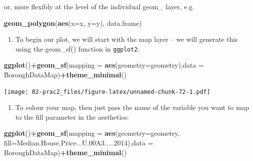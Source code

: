 \documentclass[]{book}
\newenvironment{Shaded}{\begin{snugshade}}{\end{snugshade}}
\newcommand{\DataTypeTok}[1]{\textcolor[rgb]{0.13,0.29,0.53}{#1}}
\newcommand{\DecValTok}[1]{\textcolor[rgb]{0.00,0.00,0.81}{#1}}
\newcommand{\FloatTok}[1]{\textcolor[rgb]{0.00,0.00,0.81}{#1}}
\newcommand{\KeywordTok}[1]{\textcolor[rgb]{0.13,0.29,0.53}{\textbf{#1}}}
\newcommand{\NormalTok}[1]{#1}
\newcommand{\OperatorTok}[1]{\textcolor[rgb]{0.81,0.36,0.00}{\textbf{#1}}}
\providecommand{\tightlist}{%
  \setlength{\itemsep}{0pt}\setlength{\parskip}{0pt}}
\begin{document}
or, more flexibly at the level of the individual geom\_ layer, e.g.

\begin{Shaded}
\begin{Highlighting}[]
\KeywordTok{geom_polygon}\NormalTok{(}\KeywordTok{aes}\NormalTok{(}\DataTypeTok{x=}\NormalTok{x, }\DataTypeTok{y=}\NormalTok{y), data.frame)}
\end{Highlighting}
\end{Shaded}

\begin{enumerate}
\def\labelenumi{\arabic{enumi}.}
\setcounter{enumi}{16}
\tightlist
\item
  To begin our plot, we will start with the map layer -- we will generate this using the geom\_sf() function in \texttt{ggplot2}:
\end{enumerate}

\begin{Shaded}
\begin{Highlighting}[]
\KeywordTok{ggplot}\NormalTok{()}\OperatorTok{+}\KeywordTok{geom_sf}\NormalTok{(}\DataTypeTok{mapping =} \KeywordTok{aes}\NormalTok{(}\DataTypeTok{geometry=}\NormalTok{geometry),}\DataTypeTok{data =}\NormalTok{ BoroughDataMap)}\OperatorTok{+}\KeywordTok{theme_minimal}\NormalTok{()}
\end{Highlighting}
\end{Shaded}

\texttt{[image: 02-prac2\_files/figure-latex/unnamed-chunk-72-1.pdf]}

\begin{enumerate}
\def\labelenumi{\arabic{enumi}.}
\setcounter{enumi}{17}
\tightlist
\item
  To colour your map, then just pass the name of the variable you want to map to the fill parameter in the aesthetics:
\end{enumerate}

\begin{Shaded}
\begin{Highlighting}[]
\KeywordTok{ggplot}\NormalTok{()}\OperatorTok{+}\KeywordTok{geom_sf}\NormalTok{(}\DataTypeTok{mapping =} \KeywordTok{aes}\NormalTok{(}\DataTypeTok{geometry=}\NormalTok{geometry, }\DataTypeTok{fill=}\NormalTok{Median.House.Price...U}\FloatTok{.00}\NormalTok{A3.....}\DecValTok{2014}\NormalTok{),}\DataTypeTok{data =}\NormalTok{ BoroughDataMap)}\OperatorTok{+}\KeywordTok{theme_minimal}\NormalTok{()}
\end{Highlighting}
\end{Shaded}
\end{document}

